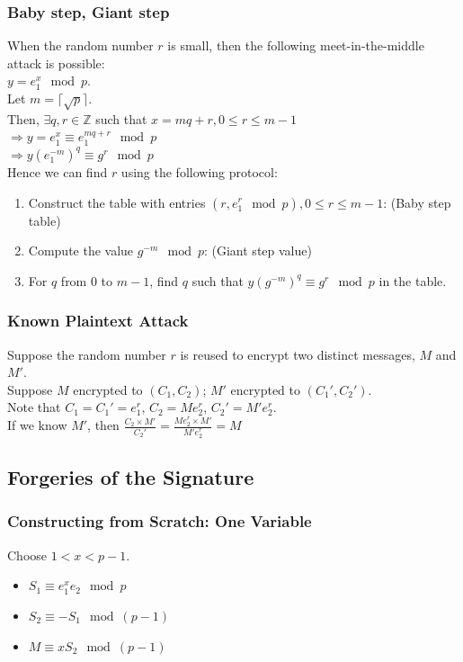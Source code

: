 \documentclass{report}
\begin{document}
			\subsubsection{Baby step, Giant step}
				When the random number $r$ is small, then the following meet-in-the-middle attack is possible:\\
				$y=e_1^x \mod p$.\\
				Let $m= \lceil \sqrt{p} \rceil$.\\
				Then, $\exists q,r \in \mathbb{Z}$ such that $x=mq+r, 0 \le r \le m-1$\\
				$\Rightarrow y=e_1^x \equiv e_1^{mq+r} \mod p$\\
				$\Rightarrow y(e_1^{-m})^q \equiv g^r \mod p$\\
				Hence we can find $r$ using the following protocol:
				\begin{enumerate}
					\item Construct the table with entries $(r,e_1^r \mod p), 0 \le r \le m-1$: (Baby step table)
					\item Compute the value $g^{-m} \mod p$: (Giant step value)
					\item For $q$ from $0$ to $m-1$, find $q$ such that $y(g^{-m})^q \equiv g^r \mod p$ in the table.
				\end{enumerate}
			
			\subsubsection{Known Plaintext Attack}
				Suppose the random number $r$ is reused to encrypt two distinct messages, $M$ and $M'$.\\
				Suppose $M$ encrypted to $(C_1,C_2)$; $M'$ encrypted to $(C_1',C_2')$.\\
				Note that $C_1=C_1'=e_1^r$, $C_2=Me_2^r$, $C_2'=M'e_2^r$.\\
				If we know $M'$, then $\frac{C_2\times M'}{C_2'}=\frac{Me_2^r\times M'}{M'e_2^r}=M$
		
		\subsection{Forgeries of the Signature}
			\subsubsection{Constructing from Scratch: One Variable}
				Choose $1<x<p-1$.
				\begin{itemize}
					\item $S_1 \equiv e_1^xe_2 \mod p$
					\item $S_2 \equiv -S_1 \mod (p-1)$
					\item $M \equiv xS_2 \mod (p-1)$
				\end{itemize}
			
\end{document}
